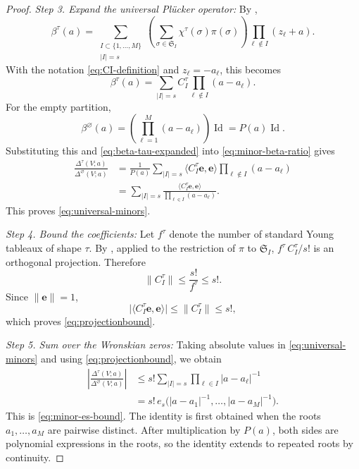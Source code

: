 \documentclass[12pt,letterpaper,reqno]{amsart}
\theoremstyle{definition}
\numberwithin{equation}{section}
\newcommand{\ev}{\bm  e}
\begin{document}
\begin{proof}
\medskip\noindent
\emph{{Step 3. Expand the universal Pl\"ucker operator:}}
By \cite[equation~(1.2)]{KP26},
\[
\beta^\tau(a)
=
\sum_{\substack{I\subset\{1,\ldots,M\}\\|I|=s}}
\left(
 \sum_{\sigma\in\mathfrak S_I}
 \chi^\tau(\sigma)\pi(\sigma)
\right)
\prod_{\ell\notin I}(z_\ell+a).
\]
With the notation \eqref{eq:CI-definition} and
\(z_\ell=-a_\ell\), this becomes
\begin{equation}\label{eq:beta-tau-expanded}
 \beta^\tau(a)
 =
 \sum_{|I|=s}
 C_I^\tau
 \prod_{\ell\notin I}(a-a_\ell).
\end{equation}
For the empty partition,
\[
\beta^\varnothing(a)
=
\left(
\prod_{\ell=1}^M(a-a_\ell)
\right)\operatorname{Id}
=
P(a)\operatorname{Id}.
\]
Substituting this and \eqref{eq:beta-tau-expanded} into
\eqref{eq:minor-beta-ratio} gives
\[
\begin{aligned}
\frac{\Delta^\tau(V;a)}
     {\Delta^\varnothing(V;a)}
&=
\frac1{P(a)}
\sum_{|I|=s}
\langle C_I^\tau\ev,\ev\rangle
\prod_{\ell\notin I}(a-a_\ell)\\
&=
\sum_{|I|=s}
\frac{\langle C_I^\tau\ev,\ev\rangle}
     {\prod_{\ell\in I}(a-a_\ell)}.
\end{aligned}
\]
This proves \eqref{eq:universal-minors}.

\medskip\noindent
\emph{{Step 4. Bound the coefficients:}}
Let \(f^\tau\) denote the number of standard Young tableaux of shape
\(\tau\). By \cite[Proposition~2.16]{KP26}, applied to the restriction
of \(\pi\) to \(\mathfrak S_I\),
$
{f^\tau\,C_I^\tau}/{s!}
$
is an orthogonal projection. Therefore
\[
\|C_I^\tau\|
\leq
\frac{s!}{f^\tau}
\leq s!.
\]
Since \(\|\ev\|=1\),
\[
\bigl|\langle C_I^\tau\ev,\ev\rangle\bigr|
\leq
\|C_I^\tau\|
\leq s!,
\]
which proves \eqref{eq:projectionbound}.

\medskip\noindent
\emph{{Step 5. Sum over the Wronskian zeros:}}
Taking absolute values in \eqref{eq:universal-minors} and using
\eqref{eq:projectionbound}, we obtain
\[
\begin{aligned}
\left|
\frac{\Delta^\tau(V;a)}
     {\Delta^\varnothing(V;a)}
\right|
&\leq
s!
\sum_{|I|=s}
\prod_{\ell\in I}|a-a_\ell|^{-1}\\
&=
s!\,
e_s\bigl(
|a-a_1|^{-1},\ldots,|a-a_M|^{-1}
\bigr).
\end{aligned}
\]
This is \eqref{eq:minor-es-bound}. The identity is first obtained
when the roots \(a_1,\ldots,a_M\) are pairwise distinct. After
multiplication by \(P(a)\), both sides are polynomial expressions in the
roots, so the identity extends to repeated roots by continuity.
\end{proof}
\end{document}
